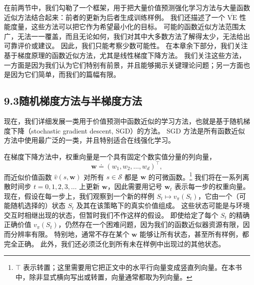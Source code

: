 \documentclass[UTF8, 12pt, fontset=fandol, oneside]{ctexart}
\begin{document}
在前两节中，我们勾勒了一个框架，用于把大量价值预测强化学习方法与大量函数近似方法结合起来：前者的更新为后者生成训练样例。
我们还描述了一个 $\overline{\mathrm{VE}}$ 性能度量，这些方法可以把它作为希望最小化的目标。
可能的函数近似方法范围太广，无法一一覆盖，而且无论如何，我们对其中大多数方法了解得太少，无法给出可靠评价或建议。
因此，我们只能考察少数可能性。
在本章余下部分，我们关注基于梯度原理的函数近似方法，尤其是线性梯度下降方法。
我们关注这些方法，一方面是因为我们认为它们特别有前景，并且能够揭示关键理论问题；另一方面也是因为它们简单，而我们的篇幅有限。

\subsection*{9.3\quad 随机梯度方法与半梯度方法}

现在，我们详细发展一类用于价值预测中函数近似的学习方法，也就是基于随机梯度下降（stochastic gradient descent, SGD）的方法。
SGD 方法是所有函数近似方法中使用最广泛的一类，并且特别适合在线强化学习。

在梯度下降方法中，权重向量是一个具有固定个数实值分量的列向量，
\[
\mathbf{w}\doteq (w_1,w_2,\ldots,w_d)^\top,
\]
而近似价值函数 $\hat{v}(s,\mathbf{w})$ 对所有 $s\in\mathcal{S}$ 都是 $\mathbf{w}$ 的可微函数。\footnote{$\top$ 表示转置；这里需要用它把正文中的水平行向量变成竖直列向量。在本书中，除非显式横向写出或转置，向量通常都取为列向量。}
我们将在一系列离散时间步 $t=0,1,2,3,\ldots$ 上更新 $\mathbf{w}$，因此需要用记号 $\mathbf{w}_t$ 表示每一步的权重向量。
现在，假设在每一步上，我们观察到一个新的样例 $S_t\mapsto v_\pi(S_t)$，它由一个（可能随机选择的）状态 $S_t$ 及其在该策略下的真实价值组成。
这些状态可能是与环境交互时相继出现的状态，但暂时我们不作这样的假设。
即使给定了每个 $S_t$ 的精确正确价值 $v_\pi(S_t)$，仍然存在一个困难问题，因为我们的函数近似器资源有限，因而分辨率有限。
特别地，通常不存在某个 $\mathbf{w}$ 能够让所有状态，甚至所有样例，都完全正确。
此外，我们还必须泛化到所有未在样例中出现过的其他状态。
\end{document}
